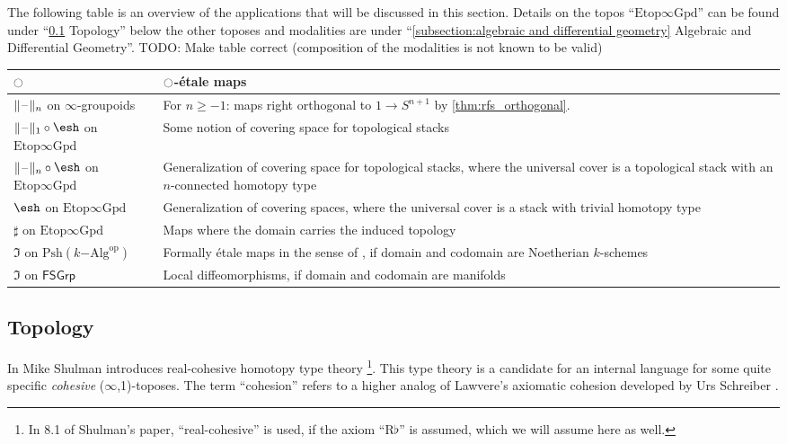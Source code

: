 \documentclass[9pt,twosided]{amsart}
\newcommand{\shape}{\ensuremath{\mathord{\raisebox{0.5pt}{\text{\rm\esh}}}}}
\newcommand{\FSGrp}{\ensuremath{\mathsf{FSGrp}}}
\newcommand{\Spaces}{\ensuremath{\mathrm{Etop}\infty\mathrm{Gpd}}}
\newcommand{\todo}[1]{{\color{red}TODO: #1 \\}}
\begin{document}
The following table is an overview of the applications that will be discussed in this section.
Details on the topos ``$\Spaces$'' can be found under ``\ref{subsection:toplogical stacks} Topology'' below the other toposes and modalities are under ``\ref{subsection:algebraic and differential geometry} Algebraic and Differential Geometry''.
\todo{Make table correct (composition of the modalities is not known to be valid)}
\begin{center}
  \begin{tabular}{p{3.5cm}p{8.5cm}}
    \toprule
    ${\ocircle}$ & ${\ocircle}$-étale maps  \\
    \midrule
    $\trunc{n}{\blank}$ on $\infty$-groupoids & For $n\geq -1$: maps right orthogonal to $1\to S^{n+1}$ by \cref{thm:rfs_orthogonal}. \\
    $\trunc{1}{\blank}\circ\shape$ on $\Spaces$ & Some notion of covering space for topological stacks \\
    $\trunc{n}{\blank}\circ\shape$ on $\Spaces$ & Generalization of covering space for topological stacks, where the universal cover is a topological stack with an $n$-connected homotopy type \\
    $\shape$ on $\Spaces$ & Generalization of covering spaces, where the universal cover is a stack with trivial homotopy type \\
    $\sharp$ on $\Spaces$ & Maps where the domain carries the induced topology \\
    $\Im$ on $\mathrm{Psh}(k\mathrm{-Alg}^\mathrm{op})$ & Formally étale maps in the sense of \cite{GrothendieckDieudonne}, if domain and codomain are Noetherian $k$-schemes   \\
    $\Im$ on $\FSGrp$ & Local diffeomorphisms, if domain and codomain are manifolds \\
    \bottomrule
  \end{tabular}
\end{center}

\bigskip

\subsection{Topology}
\label{subsection:toplogical stacks}

In \cite[Section 8]{ShulmanRealCohesion} Mike Shulman introduces real-cohesive homotopy type theory
\footnote{In 8.1 of Shulman's paper, ``real-cohesive'' is used, if the axiom ``$\mathrm{R}\flat$'' is assumed, which we will assume here as well.}.
This type theory is a candidate for an internal language for some quite specific \emph{cohesive} ($\infty$,1)-toposes.
The term ``cohesion'' refers to a higher analog 
of Lawvere's axiomatic cohesion \cite{Lawvere07} developed by Urs Schreiber \cite{SchreiberDcct}.
\end{document}
